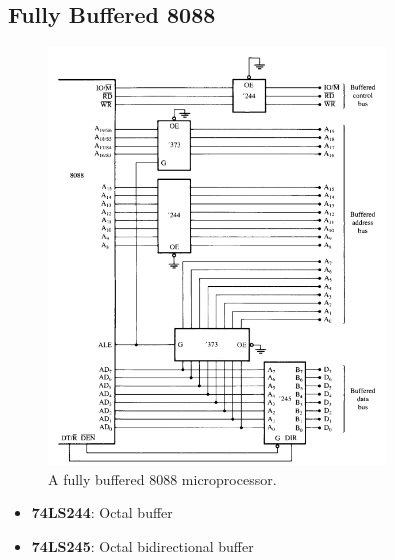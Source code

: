 \subsection{Fully Buffered 8088}
\begin{figure}[h!]
  \includegraphics[width = 0.8\textwidth]{./figures/8088_fully_buff.png}
  \caption{A fully buffered 8088 microprocessor.}
  \label{}
\end{figure}
\begin{itemize}
  \item \textbf{74LS244}: Octal buffer
  \item \textbf{74LS245}: Octal bidirectional buffer

\end{itemize}


